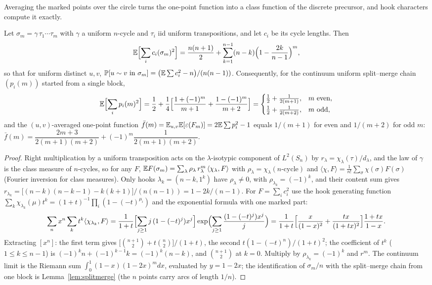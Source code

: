 Averaging the marked points over the circle turns the one-point
function into a class function of the discrete precursor, and hook
characters compute it exactly.

\begin{theorem}
\label{thm:exactonepoint}
Let $\sigma_m=\gamma\,\tau_1\cdots\tau_m$ with $\gamma$ a uniform
$n$-cycle and $\tau_i$ iid uniform transpositions, and let $c_i$ be
its cycle lengths.  Then
\[
\mathbb{E}\Bigl[\sum_i c_i(\sigma_m)^2\Bigr]
=\frac{n(n+1)}2+\sum_{k=1}^{n-1}(n-k)\Bigl(1-\frac{2k}{n-1}\Bigr)^{m},
\]
so that for uniform distinct $u,v$,
$\mathbb{P}[u\sim v\text{ in }\sigma_m]=\bigl(\mathbb{E}\sum c_i^2-n\bigr)/(n(n-1))$.
Consequently, for the continuum uniform split--merge chain
$(p_i(m))$ started from a single block,
\[
\mathbb{E}\Bigl[\sum_i p_i(m)^2\Bigr]
=\frac12+\frac14\Bigl[\frac{1+(-1)^m}{m+1}+\frac{1-(-1)^m}{m+2}\Bigr]
=\begin{cases}\tfrac12+\tfrac1{2(m+1)},& m\text{ even},\\[2pt]
\tfrac12+\tfrac1{2(m+2)},& m\text{ odd},\end{cases}
\]
and the $(u,v)$-averaged one-point function
$\bar f(m)=\mathbb{E}_{u,v}\mathbb{E}[\varepsilon(F_m)]=2\mathbb{E}\sum p_i^2-1$ equals
$1/(m+1)$ for even and $1/(m+2)$ for odd $m$:
$\bar f(m)=\dfrac{2m+3}{2(m+1)(m+2)}+(-1)^m\dfrac{1}{2(m+1)(m+2)}$.
\end{theorem}

\begin{proof}
Right multiplication by a uniform transposition acts on the
$\lambda$-isotypic component of $L^2(S_n)$ by
$r_\lambda=\chi_\lambda(\tau)/d_\lambda$, and the law of $\gamma$ is
the class measure of $n$-cycles, so for any $F$,
$\mathbb{E} F(\sigma_m)=\sum_\lambda \rho_\lambda\,r_\lambda^{m}\,
\langle\chi_\lambda,F\rangle$ with
$\rho_\lambda=\chi_\lambda(n\text{-cycle})$ and
$\langle\chi,F\rangle=\frac1{n!}\sum_\sigma\chi(\sigma)F(\sigma)$
(Fourier inversion for class measures).  Only hooks
$\lambda_k=(n-k,1^k)$ have $\rho_{\lambda}\ne0$, with
$\rho_{\lambda_k}=(-1)^k$, and their content sum gives
$r_{\lambda_k}=\bigl[(n-k)(n-k-1)-k(k+1)\bigr]/(n(n-1))=1-2k/(n-1)$.
For $F=\sum_ic_i^2$ use the hook generating function
$\sum_k\chi_{\lambda_k}(\mu)t^k=(1+t)^{-1}\prod_i(1-(-t)^{\mu_i})$ and
the exponential formula with one marked part:
\[
\sum_{n}x^n\sum_k t^k\langle\chi_{\lambda_k},F\rangle
=\frac1{1+t}\Bigl[\sum_{j\ge1}j\,(1-(-t)^j)x^j\Bigr]
\exp\Bigl(\sum_{j\ge1}\frac{(1-(-t)^j)x^j}{j}\Bigr)
=\frac1{1+t}\Bigl[\frac{x}{(1-x)^2}+\frac{tx}{(1+tx)^2}\Bigr]
\frac{1+tx}{1-x}.
\]
Extracting $[x^n]$: the first term gives
$\bigl[\binom{n+1}2+t\binom n2\bigr]/(1+t)$, the second
$t(1-(-t)^n)/(1+t)^2$; the coefficient of $t^k$ ($1\le k\le n-1$) is
$(-1)^kn+(-1)^{k-1}k=(-1)^k(n-k)$, and $\binom{n+1}2$ at $k=0$.
Multiply by $\rho_{\lambda_k}=(-1)^k$ and $r^m$.  The continuum limit
is the Riemann sum $\int_0^1(1-x)(1-2x)^m dx$, evaluated by
$y=1-2x$; the identification of $\sigma_m/n$ with the split--merge
chain from one block is Lemma~\ref{lem:splitmerge} (the $n$ points
carry arcs of length $1/n$).
\end{proof}

